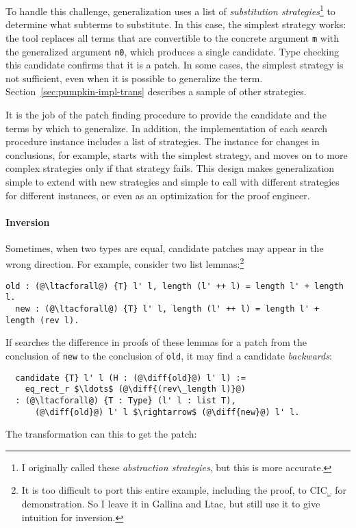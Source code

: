 To handle this challenge, generalization uses a list of \textit{substitution strategies}\footnote{I originally called these \textit{abstraction strategies}, but this is more accurate.}
to determine what subterms to substitute.
In this case, the simplest strategy works: the tool
replaces all terms that are convertible to the concrete argument \lstinline{m} with the generalized argument
\lstinline{n0}, which produces a single candidate. Type checking this candidate confirms that it is a patch.
In some cases, the simplest strategy is not sufficient, even when it is possible to generalize the term.
Section~\ref{sec:pumpkin-impl-trans} describes a sample of other strategies.

It is the job of the patch finding procedure to provide the candidate and the terms by which to generalize.
In addition, the implementation of each search procedure instance includes a list of strategies.
The instance for changes in conclusions, for example, starts with the simplest strategy,
and moves on to more complex strategies only if that strategy fails.
This design makes generalization simple to extend with new strategies and simple to call with different strategies
for different instances, or even as an optimization for the proof engineer.

\paragraph{Inversion} Sometimes, when two types are  equal,
candidate patches may appear in the wrong direction.
For example, consider two list lemmas:\footnote{It is too difficult to port this entire example, including the proof, to CIC$_{\omega}$ for demonstration.
So I leave it in Gallina and Ltac, but still use it to give intuition for inversion.}

\begin{lstlisting}[language=coq]
  old : (@\ltacforall@) {T} l' l, length (l' ++ l) = length l' + length l.
  new : (@\ltacforall@) {T} l' l, length (l' ++ l) = length l' + length (rev l).
\end{lstlisting} 
If \sysname searches the difference in proofs of these lemmas for a patch from the 
conclusion of \lstinline{new} to the conclusion of \lstinline{old},
it may find a candidate \emph{backwards}:

\begin{lstlisting}
  candidate {T} l' l (H : (@\diff{old}@) l' l) :=
    eq_rect_r $\ldots$ (@\diff{(rev\_length l)}@)
  : (@\ltacforall@) {T : Type} (l' l : list T),
      (@\diff{old}@) l' l $\rightarrow$ (@\diff{new}@) l' l.
\end{lstlisting}
The transformation can  this to get the patch: %

